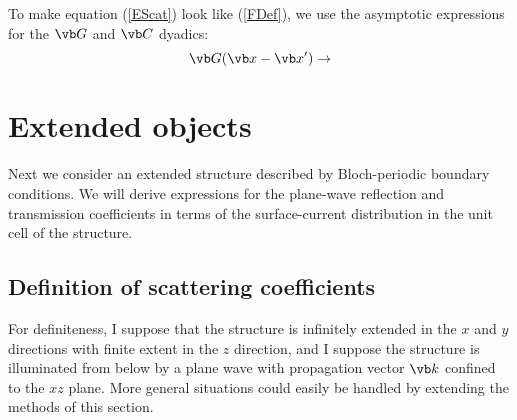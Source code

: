 \documentclass[letterpaper]{article}
\begin{document}
To make equation (\ref{EScat}) look like (\ref{FDef}), we use
the asymptotic expressions for the $\vb G$ and $\vb C$ dyadics:
$$ \vb G(\vb x-\vb x^\prime) \to
$$

\newpage
\section{Extended objects}

Next we consider an extended structure described by Bloch-periodic
boundary conditions. We will derive expressions for the 
plane-wave reflection and transmission coefficients in terms
of the surface-current distribution in the unit cell of the structure.

\subsection*{Definition of scattering coefficients}

For definiteness, I suppose that the structure is infinitely 
extended in the $x$ and $y$ directions with finite extent in
the $z$ direction, and I suppose the structure is illuminated 
from below by a plane wave with propagation vector $\vb k$ 
confined to the $xz$ plane. More general situations could easily be 
handled by extending the methods of this section.
\end{document}
